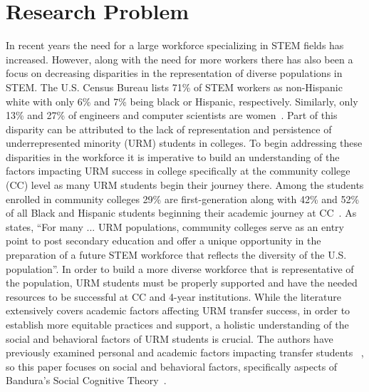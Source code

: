\documentclass{article}
\begin{document}
\section{Research Problem}
In recent years the need for a large workforce specializing in STEM fields has increased. However, along with the need for more workers there has also been a focus on decreasing disparities in the representation of diverse populations in STEM. The U.S. Census Bureau lists 71\% of STEM workers as non-Hispanic white with only 6\% and 7\% being black or Hispanic, respectively. Similarly, only 13\% and 27\% of engineers and computer scientists are women~\cite{landivar2013disparities}. Part of this disparity can be attributed to the lack of representation and persistence of underrepresented minority (URM) students in colleges. To begin addressing these disparities in the workforce it is imperative to build an understanding of the factors impacting URM success in college specifically at the community college (CC) level as many URM students begin their journey there. Among the students enrolled in community colleges 29\% are first-generation along with 42\% and 52\% of all Black and Hispanic students beginning their academic journey at CC~\cite{chamely2021undergraduate}. 
As~\cite{chen2015community} states, “For many ... URM populations, community colleges serve as an entry point to post secondary education and offer a unique opportunity in the preparation of a future STEM workforce that reflects the diversity of the U.S. population”.
In order to build a more diverse workforce that is representative of the population, URM students must be properly supported and have the needed resources to be successful at CC and 4-year institutions.
While the literature extensively covers academic factors affecting URM transfer success, in order to establish more equitable practices and support, a holistic understanding of the social and behavioral factors of URM students is crucial.
The authors have previously examined personal and academic factors impacting transfer students ~\cite{BlindAuthors2023}, so this paper focuses on social and behavioral factors, specifically aspects of Bandura’s Social Cognitive Theory~\cite{bandura1986social}.
\end{document}
